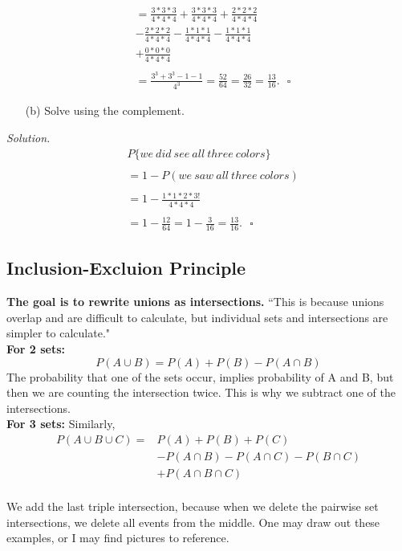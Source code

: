 \documentclass[12pt]{book}
\begin{document}
\begin{align*}
&=\frac{3*3*3}{4*4*4} + \frac{3*3*3}{4*4*4} + \frac{2*2*2}{4*4*4}\\
&-\frac{2*2*2}{4*4*4} - \frac{1*1*1}{4*4*4} - \frac{1*1*1}{4*4*4}\\
&+\frac{0*0*0}{4*4*4}\\\\
&=\frac{3^{3}+3^{3}-1-1}{4^{3}}=\frac{52}{64} = \frac{26}{32} = \frac{13}{16}.~~~\square
\end{align*}
\begin{itemize}\item[(b)] Solve using the complement.\end{itemize}
\textit{Solution.}\\
\begin{align*}
&P\{we~did~see~all~three~colors\}\\\\
&=1-P(we~saw~all~three~colors)\\\\
&=1- \frac{1*1*2*3!}{4*4*4}\\\\
&=1- \frac{12}{64} = 1- \frac{3}{16} =\frac{13}{16}.~~~\square
\end{align*}




\subsection{Inclusion-Excluion Principle}
\textbf{The goal is to rewrite unions as intersections.} ``This is because unions overlap and are difficult to calculate, but individual sets and intersections are simpler to calculate."\\
\newpage
\noindent \textbf{For 2 sets:}
$$P(A \cup B) = P(A) + P(B) - P(A \cap B)$$
The probability that one of the sets occur, implies probability of A and B, but then we are counting the intersection twice. This is why we subtract one of the intersections.\\

\noindent \textbf{For 3 sets:}
Similarly,
\begin{align*}
P(A\cup B \cup C)=&P(A)+P(B)+P(C)\\
&-P(A\cap B) - P(A\cap C) - P(B\cap C) \\
&+ P(A\cap B\cap C)\\
\end{align*}

We add the last triple intersection, because when we delete the pairwise set intersections, we delete all events from the middle. One may draw out these examples, or I may find pictures to reference.\\
\end{document}
